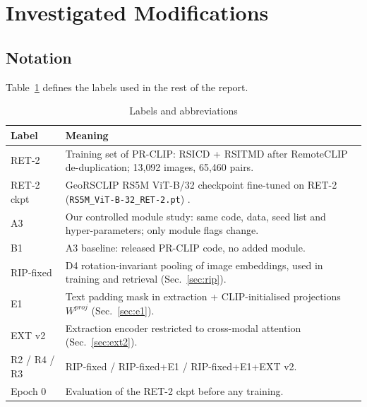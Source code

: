 \documentclass[conference]{IEEEtran}
\begin{document}
\section{Investigated Modifications}

\subsection{Notation}
Table~\ref{tab:notation} defines the labels used in the rest of the report.

\begin{table}[t]
\centering
\caption{Labels and abbreviations}
\label{tab:notation}
\footnotesize
\begin{tabular}{@{}p{}p{}@{}}
\toprule
Label & Meaning \\
\midrule
RET-2 & Training set of PR-CLIP: RSICD + RSITMD after RemoteCLIP de-duplication; 13{,}092 images, 65{,}460 pairs. \\
RET-2 ckpt & GeoRSCLIP RS5M ViT-B/32 checkpoint fine-tuned on RET-2 (\texttt{RS5M\_ViT-B-32\_RET-2.pt}) \cite{zhang2024georsclip}. \\
A3 & Our controlled module study: same code, data, seed list and hyper-parameters; only module flags change. \\
B1 & A3 baseline: released PR-CLIP code, no added module. \\
RIP-fixed & D4 rotation-invariant pooling of image embeddings, used in training and retrieval (Sec.~\ref{sec:rip}). \\
E1 & Text padding mask in extraction + CLIP-initialised projections $W^{proj}$ (Sec.~\ref{sec:e1}). \\
EXT v2 & Extraction encoder restricted to cross-modal attention (Sec.~\ref{sec:ext2}). \\
R2 / R4 / R3 & RIP-fixed / RIP-fixed+E1 / RIP-fixed+E1+EXT v2. \\
Epoch 0 & Evaluation of the RET-2 ckpt before any training. \\
\bottomrule
\end{tabular}
\end{table}
\end{document}
